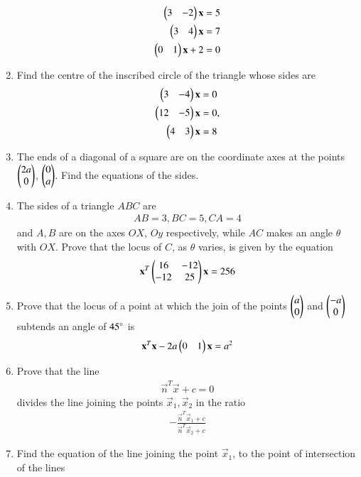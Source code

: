 \begin{enumerate}[label=\arabic*.,ref=\thesubsection.\theenumi]
\begin{align}
\begin{pmatrix}3&-2\end{pmatrix}\mathbf{x}=5
\\ 
\begin{pmatrix}3 &4\end{pmatrix}\mathbf{x}=7
\\
\begin{pmatrix}0 & 1\end{pmatrix}\mathbf{x}  +2 = 0
\end{align}
\item Find the centre of the inscribed circle of the triangle whose sides are
\begin{align}
\begin{pmatrix}3&-4\end{pmatrix}\mathbf{x}&=0
\\
\begin{pmatrix} 12&-5\end{pmatrix}\mathbf{x}&=0,
\\ 
\begin{pmatrix}4&3\end{pmatrix}\mathbf{x}&=8
\end{align}
\renewcommand{\theequation}{\theenumi}
\item The ends of a diagonal of a square are on the coordinate axes at the points $\begin{pmatrix}2a\\0\end{pmatrix}$, $\begin{pmatrix}0\\a\end{pmatrix}$.  Find the equations of the sides.
\item The sides of a triangle $ABC$ are
\begin{align}
AB=3, BC = 5, CA = 4
\end{align}
and $A, B$ are on the axes $OX$, $Oy$ respectively, while $AC$ makes an angle $\theta$ with $OX$.  Prove that the locus of $C$, as $\theta$ varies, is given by the equation
\begin{align}
\mathbf{x}^T\begin{pmatrix}16 & -12\\-12 & 25\end{pmatrix}\mathbf{x} = 256
\end{align}
\item Prove that the locus of a point at which the join of the points $\begin{pmatrix}a\\0\end{pmatrix}$ and $\begin{pmatrix}-a\\0\end{pmatrix}$ subtends an angle of $45\degree$ is
\begin{align}
\mathbf{x}^T\mathbf{x}-2a\begin{pmatrix}0 & 1\end{pmatrix}\mathbf{x} = a^2
\end{align}
\item Prove that the line
\begin{align}
\vec{n}^T\vec{x}+c=0
\end{align}
divides the line joining  the points $\vec{x}_1, \vec{x}_2$ in the ratio
\begin{align}
-\frac{\vec{n}^T\vec{x}_1+c}{\vec{n}^T\vec{x}_2+c}
\end{align}
\item Find the equation of the line joining the point $\vec{x}_1$, to the point of intersection of the lines
\begin{align}

\end{align}
\end{enumerate}
